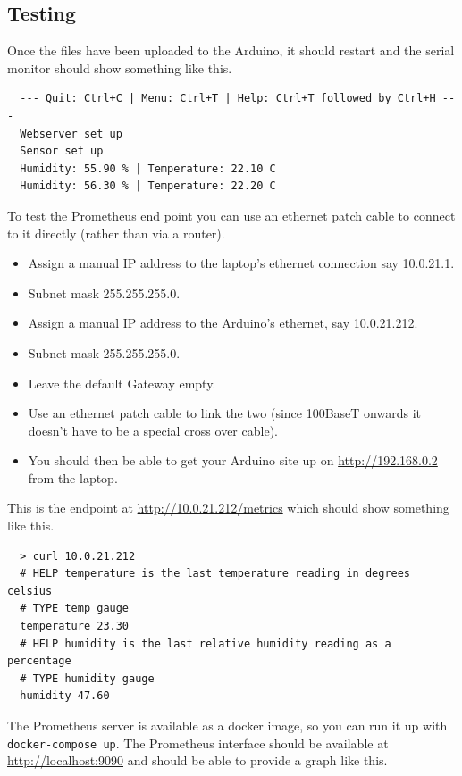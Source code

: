 \documentclass[a4paper, 11pt]{article}
\begin{document}
\subsection{Testing}

Once the files have been uploaded to the Arduino,
it should restart and the serial monitor should show something like this.

\begin{verbatim}
  --- Quit: Ctrl+C | Menu: Ctrl+T | Help: Ctrl+T followed by Ctrl+H ---
  Webserver set up
  Sensor set up
  Humidity: 55.90 % | Temperature: 22.10 C
  Humidity: 56.30 % | Temperature: 22.20 C
\end{verbatim}

To test the Prometheus end point you can use an ethernet patch cable to connect to it directly
(rather than via a router).

\begin{itemize}
  \item Assign a manual IP address to the laptop's ethernet connection say 10.0.21.1.
  \item Subnet mask 255.255.255.0.
  \item Assign a manual IP address to the Arduino's ethernet, say 10.0.21.212.
  \item Subnet mask 255.255.255.0.
  \item Leave the default Gateway empty.
  \item Use an ethernet patch cable to link the two (since 100BaseT onwards it doesn't have to be a special cross over cable).
  \item You should then be able to get your Arduino site up on \url{http://192.168.0.2} from the laptop.
\end{itemize}
  
This is the endpoint at \url{http://10.0.21.212/metrics} which should show something like this.
  
\begin{verbatim}
  > curl 10.0.21.212
  # HELP temperature is the last temperature reading in degrees celsius
  # TYPE temp gauge
  temperature 23.30
  # HELP humidity is the last relative humidity reading as a percentage
  # TYPE humidity gauge
  humidity 47.60
\end{verbatim}

The Prometheus server is available as a docker image,
so you can run it up with \verb|docker-compose up|.
The Prometheus interface should be available at \url{http://localhost:9090}
and should be able to provide a graph like this.
\end{document}
